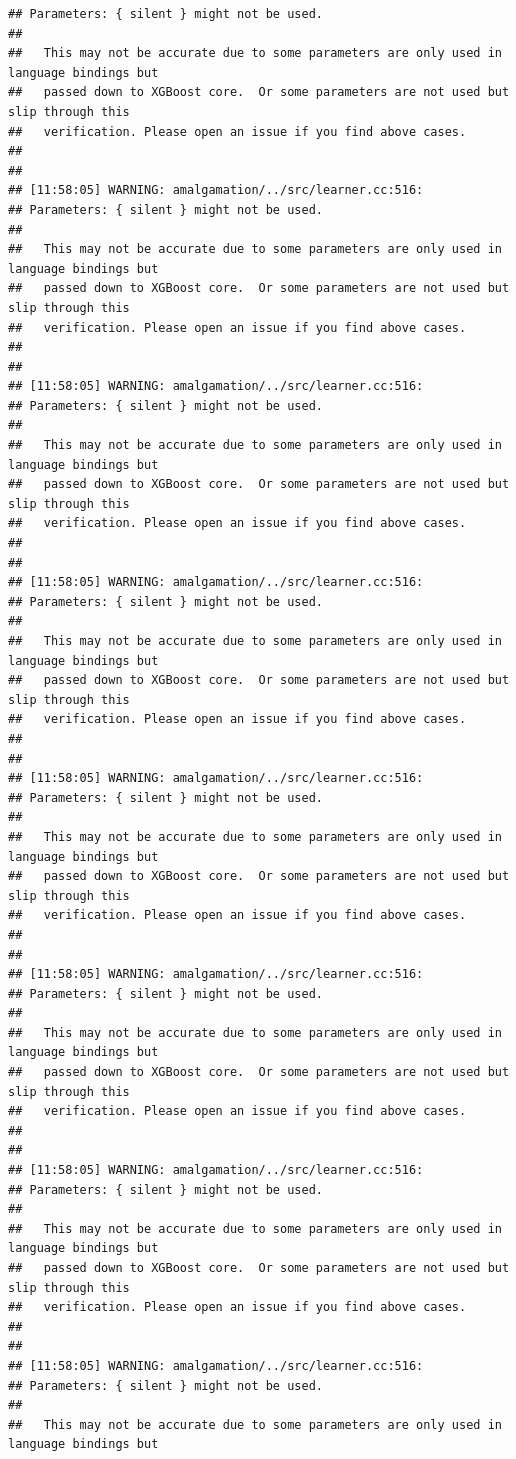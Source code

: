\documentclass[AMS,STIX2COL]{WileyNJD-v2}\usepackage[]{graphicx}\usepackage[]{color}
\makeatletter
\newenvironment{kframe}{%
 \def\at@end@of@kframe{}%
 \ifinner\ifhmode%
  \def\at@end@of@kframe{\end{minipage}}%
  \begin{minipage}{\columnwidth}%
 \fi\fi%
 \def\FrameCommand##1{\hskip\@totalleftmargin \hskip-\fboxsep
 \colorbox{shadecolor}{##1}\hskip-\fboxsep
     \hskip-\linewidth \hskip-\@totalleftmargin \hskip\columnwidth}%
 \MakeFramed {\advance\hsize-\width
   \@totalleftmargin\z@ \linewidth\hsize
   \@setminipage}}%
 {\par\unskip\endMakeFramed%
 \at@end@of@kframe}
\newenvironment{knitrout}{}{} %
\makeatother
\begin{document}
\begin{knitrout}
\begin{kframe}
\begin{verbatim}
## Parameters: { silent } might not be used.
## 
##   This may not be accurate due to some parameters are only used in language bindings but
##   passed down to XGBoost core.  Or some parameters are not used but slip through this
##   verification. Please open an issue if you find above cases.
## 
## 
## [11:58:05] WARNING: amalgamation/../src/learner.cc:516: 
## Parameters: { silent } might not be used.
## 
##   This may not be accurate due to some parameters are only used in language bindings but
##   passed down to XGBoost core.  Or some parameters are not used but slip through this
##   verification. Please open an issue if you find above cases.
## 
## 
## [11:58:05] WARNING: amalgamation/../src/learner.cc:516: 
## Parameters: { silent } might not be used.
## 
##   This may not be accurate due to some parameters are only used in language bindings but
##   passed down to XGBoost core.  Or some parameters are not used but slip through this
##   verification. Please open an issue if you find above cases.
## 
## 
## [11:58:05] WARNING: amalgamation/../src/learner.cc:516: 
## Parameters: { silent } might not be used.
## 
##   This may not be accurate due to some parameters are only used in language bindings but
##   passed down to XGBoost core.  Or some parameters are not used but slip through this
##   verification. Please open an issue if you find above cases.
## 
## 
## [11:58:05] WARNING: amalgamation/../src/learner.cc:516: 
## Parameters: { silent } might not be used.
## 
##   This may not be accurate due to some parameters are only used in language bindings but
##   passed down to XGBoost core.  Or some parameters are not used but slip through this
##   verification. Please open an issue if you find above cases.
## 
## 
## [11:58:05] WARNING: amalgamation/../src/learner.cc:516: 
## Parameters: { silent } might not be used.
## 
##   This may not be accurate due to some parameters are only used in language bindings but
##   passed down to XGBoost core.  Or some parameters are not used but slip through this
##   verification. Please open an issue if you find above cases.
## 
## 
## [11:58:05] WARNING: amalgamation/../src/learner.cc:516: 
## Parameters: { silent } might not be used.
## 
##   This may not be accurate due to some parameters are only used in language bindings but
##   passed down to XGBoost core.  Or some parameters are not used but slip through this
##   verification. Please open an issue if you find above cases.
## 
## 
## [11:58:05] WARNING: amalgamation/../src/learner.cc:516: 
## Parameters: { silent } might not be used.
## 
##   This may not be accurate due to some parameters are only used in language bindings but

\end{verbatim}
\end{kframe}
\end{knitrout}
\end{document}
